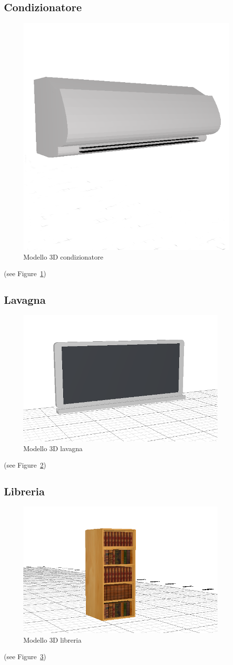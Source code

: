 \subsection*{Condizionatore}
\begin{figure}[htbp] %
   \centering
   \includegraphics[width=0.5\linewidth]{images/condizionatore}
   \caption{Modello 3D condizionatore}
   \label{fig:condizionatore}
   \end{figure}
   (see Figure~\ref{fig:condizionatore})
   \newpage

\subsection*{Lavagna}
\begin{figure}[htbp] %
   \centering
   \includegraphics[width=0.5\linewidth]{images/lavagna}
   \caption{Modello 3D lavagna}
   \label{fig:lavagna}
   \end{figure}
   (see Figure~\ref{fig:lavagna})
   \newpage

\subsection*{Libreria}
\begin{figure}[htbp] %
   \centering
   \includegraphics[width=0.5\linewidth]{images/bookcase}
   \caption{Modello 3D libreria}
   \label{fig:libreria}
   \end{figure}
   (see Figure~\ref{fig:libreria})
   \newpage

